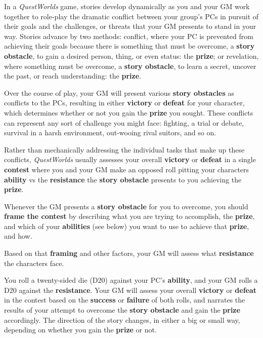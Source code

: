 \documentclass[
]{article}
\begin{document}
In a \emph{QuestWorlds} game, stories develop dynamically as you and
your GM work together to role-play the dramatic conflict between your
group's PCs in pursuit of their goals and the challenges, or threats
that your GM presents to stand in your way. Stories advance by two
methods: conflict, where your PC is prevented from achieving their goals
because there is something that must be overcome, a \textbf{story
obstacle}, to gain a desired person, thing, or even status: the
\textbf{prize}; or revelation, where something must be overcome, a
\textbf{story obstacle}, to learn a secret, uncover the past, or reach
understanding: the \textbf{prize}.

Over the course of play, your GM will present various \textbf{story
obstacles} as conflicts to the PCs, resulting in either \textbf{victory}
or \textbf{defeat} for your character, which determines whether or not
you gain the \textbf{prize} you sought. These conflicts can represent
any sort of challenge you might face: fighting, a trial or debate,
survival in a harsh environment, out-wooing rival suitors, and so on.

Rather than mechanically addressing the individual tasks that make up
these conflicts, \emph{QuestWorlds} usually assesses your overall
\textbf{victory} or \textbf{defeat} in a single \textbf{contest} where
you and your GM make an opposed roll pitting your characters
\textbf{ability} vs the \textbf{resistance} the \textbf{story obstacle}
presents to you achieving the \textbf{prize}.

Whenever the GM presents a \textbf{story obstacle} for you to overcome,
you should \textbf{frame the contest} by describing what you are trying
to accomplish, the \textbf{prize}, and which of your \textbf{abilities}
(see below) you want to use to achieve that \textbf{prize}, and how.

Based on that \textbf{framing} and other factors, your GM will assess
what \textbf{resistance} the characters face.

You roll a twenty-sided die (D20) against your PC's \textbf{ability},
and your GM rolls a D20 against the \textbf{resistance}. Your GM will
assess your overall \textbf{victory} or \textbf{defeat} in the contest
based on the \textbf{success} or \textbf{failure} of both rolls, and
narrates the results of your attempt to overcome the \textbf{story
obstacle} and gain the \textbf{prize} accordingly. The direction of the
story changes, in either a big or small way, depending on whether you
gain the \textbf{prize} or not.
\end{document}

